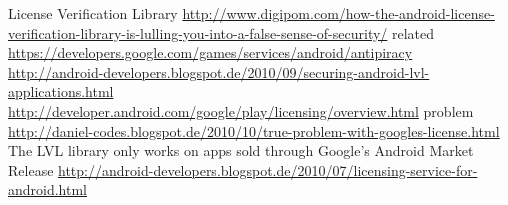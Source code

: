 License Verification Library\newline
\url{http://www.digipom.com/how-the-android-license-verification-library-is-lulling-you-into-a-false-sense-of-security/}\newline
related \url{https://developers.google.com/games/services/android/antipiracy}\newline
\url{http://android-developers.blogspot.de/2010/09/securing-android-lvl-applications.html}\newline
\url{http://developer.android.com/google/play/licensing/overview.html}\newline
problem \url{http://daniel-codes.blogspot.de/2010/10/true-problem-with-googles-license.html}\newline
The LVL library only works on apps sold through Google's Android Market
Release \url{http://android-developers.blogspot.de/2010/07/licensing-service-for-android.html}
